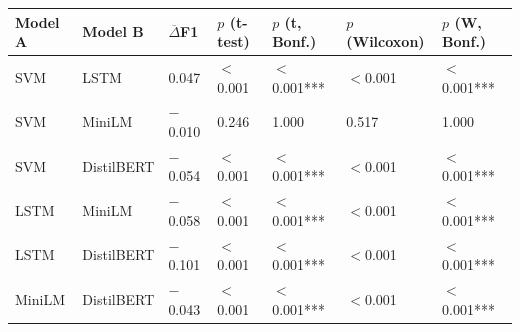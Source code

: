 \begin{tabularx}{\textwidth}{@{}llYYYYY@{}}
\hline
Model A & Model B & $\overline{\Delta}$F1 & $p$ (t-test) & $p$ (t, Bonf.) & $p$ (Wilcoxon) & $p$ (W, Bonf.) \\
\hline
SVM & LSTM & 0.047 & $<$0.001 & $<$0.001*** & $<$0.001 & $<$0.001*** \\
SVM & MiniLM & $-$0.010 & 0.246 & 1.000 & 0.517 & 1.000 \\
SVM & DistilBERT & $-$0.054 & $<$0.001 & $<$0.001*** & $<$0.001 & $<$0.001*** \\
LSTM & MiniLM & $-$0.058 & $<$0.001 & $<$0.001*** & $<$0.001 & $<$0.001*** \\
LSTM & DistilBERT & $-$0.101 & $<$0.001 & $<$0.001*** & $<$0.001 & $<$0.001*** \\
MiniLM & DistilBERT & $-$0.043 & $<$0.001 & $<$0.001*** & $<$0.001 & $<$0.001*** \\
\hline
\end{tabularx}
